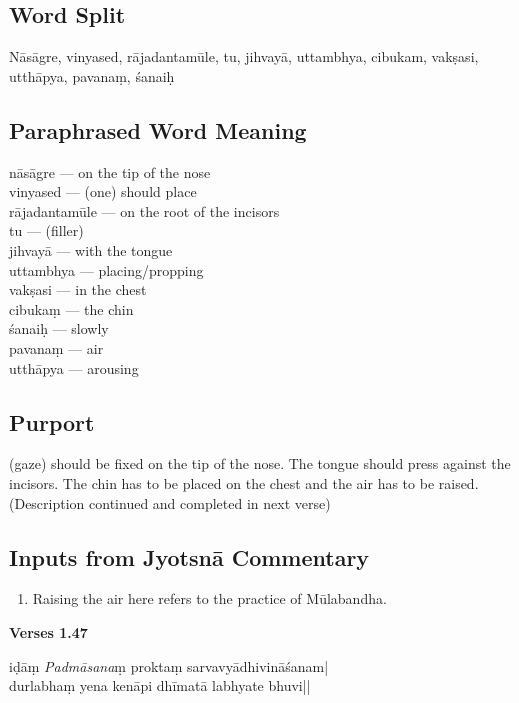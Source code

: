 \subsection*{Word Split}

Nāsāgre, vinyased, rājadantamūle, tu, jihvayā, uttambhya, cibukam, vakṣasi, utthāpya, pavanaṃ, śanaiḥ

\subsection*{Paraphrased Word Meaning}

\begin{multicols}{2}
nāsāgre ---  on the tip of the nose \\
vinyased --- (one) should place  \\
rājadantamūle ---  on the root of the incisors   \\
tu --- (filler)  \\
jihvayā --- with the tongue \\
uttambhya ---  placing/propping \\
vakṣasi --- in the chest  \\
cibukaṃ ---  the chin  \\
śanaiḥ --- slowly  \\
pavanaṃ ---   air  \\
utthāpya --- arousing
\end{multicols}

\subsection*{Purport}

(gaze) should be fixed on the tip of the nose. The tongue should press against the incisors. The chin has to be placed on the chest and the air has to be raised. (Description continued and completed in next verse)

\subsection*{Inputs from Jyotsnā Commentary}

\begin{enumerate}
\item Raising the air here refers to the practice of Mūlabandha.   
\end{enumerate}

\newpage
\noindent \textbf{Verses 1.47}

\begin{shloka}
iḍāṃ \textit{Padmāsana}ṃ proktaṃ sarvavyādhivināśanam|\\
durlabhaṃ yena kenāpi dhīmatā labhyate bhuvi||
\end{shloka}

